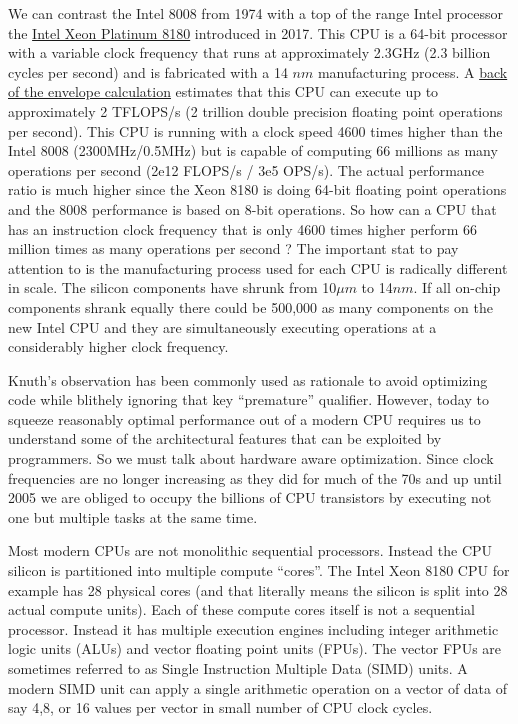 We can contrast the Intel 8008 from 1974 with a top of the range Intel processor the \href{https://en.wikichip.org/wiki/intel/xeon_platinum/8180}{Intel Xeon Platinum 8180} introduced in 2017. This CPU is a 64-bit processor with a variable clock frequency that runs at approximately 2.3GHz (2.3 billion cycles per second) and is fabricated with a 14 $nm$ manufacturing process. A \href{https://software.intel.com/en-us/forums/software-tuning-performance-optimization-platform-monitoring/topic/761046}{back of the envelope calculation} estimates that this CPU can execute up to approximately 2 TFLOPS/s (2 trillion double precision floating point operations per second). This CPU is running with a clock speed 4600 times higher than the Intel 8008 (2300MHz/0.5MHz) but is capable of computing 66 millions as many operations per second (2e12 FLOPS/s / 3e5 OPS/s). The actual performance ratio is much higher since the Xeon 8180 is doing 64-bit floating point operations and the  8008 performance is based on 8-bit operations. So how can a CPU that has an instruction clock frequency that is only 4600 times higher perform 66 million times as many operations per second ? The important stat to pay attention to is the manufacturing process used for each CPU is radically different in scale. The silicon components have shrunk from 10$\mu m$ to 14$nm$. If all on-chip components shrank equally there could be 500,000 as many components on the new Intel CPU and they are simultaneously executing operations at a considerably higher clock frequency.

Knuth's observation has been commonly used as rationale to avoid optimizing code while blithely ignoring that key ``premature'' qualifier. However, today to squeeze reasonably optimal performance out of a modern CPU requires us to understand some of the architectural features that can be exploited by programmers. So we must talk about hardware aware optimization.  Since clock frequencies are no longer increasing as they did for much of the 70s and up until 2005 we are obliged to occupy the billions of CPU transistors by executing not one but multiple tasks at the same time.

Most modern CPUs are not monolithic sequential processors. Instead the CPU silicon is partitioned into multiple compute ``cores''. The Intel Xeon 8180 CPU for example has 28 physical cores (and that literally means the silicon is split into 28 actual compute units). Each of these compute cores itself is not a sequential processor. Instead it has multiple execution engines including integer arithmetic logic units (ALUs) and vector floating point units (FPUs). The vector FPUs are sometimes referred to as Single Instruction Multiple Data (SIMD) units. A modern SIMD unit can apply a single arithmetic operation on a vector of data of say 4,8, or 16 values per vector in small number of CPU clock cycles. 

